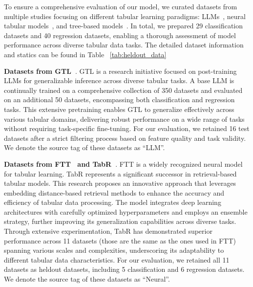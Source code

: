 
To ensure a comprehensive evaluation of our model, we curated datasets from multiple studies focusing on different tabular learning paradigms: LLMs~\citep{wen2024GTL}, neural tabular models~\citep{gorishniy2021revisit_tab_dnn,gorishniy2024TabR}, and tree-based models~\citep{grinsztajn2022tree_gt_tab_nn}.
In total, we prepared 29 classification datasets and 40 regression datasets, enabling a thorough assessment of model performance across diverse tabular data tasks. The detailed dataset information and statics can be found in Table ~\ref{tab:heldout_data}

\textbf{Datasets from GTL~\citep{wen2024GTL}}. GTL is a research initiative focused on post-training LLMs for generalizable inference across diverse tabular tasks. A base LLM is continually trained on a comprehensive collection of 350 datasets and evaluated on an additional 50 datasets, encompassing both classification and regression tasks. This extensive pretraining enables GTL to generalize effectively across various tabular domains, delivering robust performance on a wide range of tasks without requiring task-specific fine-tuning. For our evaluation, we retained 16 test datasets after a strict filtering process based on feature quality and task validity.
We denote the source tag of these datasets as ``LLM''.

\textbf{Datasets from FTT~\citep{gorishniy2021revisit_tab_dnn} and TabR~\citep{gorishniy2024TabR}}. FTT is a widely recognized neural model for tabular learning. TabR represents a significant successor in retrieval-based tabular models. This research proposes an innovative approach that leverages embedding distance-based retrieval methods to enhance the accuracy and efficiency of tabular data processing. The model integrates deep learning architectures with carefully optimized hyperparameters and employs an ensemble strategy, further improving its generalization capabilities across diverse tasks. Through extensive experimentation, TabR has demonstrated superior performance across 11 datasets (those are the same as the ones used in FTT) spanning various scales and complexities, underscoring its adaptability to different tabular data characteristics. For our evaluation, we retained all 11 datasets as heldout datasets, including 5 classification and 6 regression datasets.
We denote the source tag of these datasets as ``Neural''.

